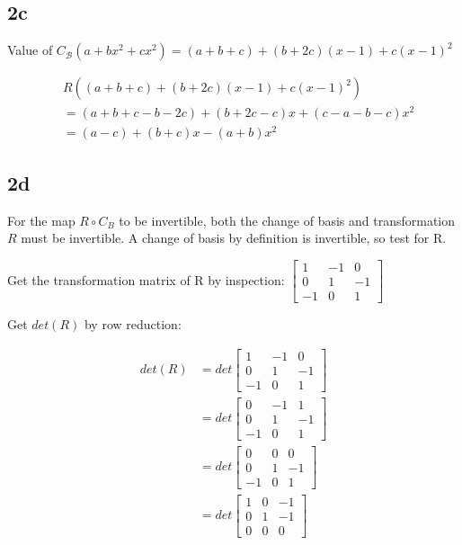 \documentclass{article}
\begin{document}
\subsection*{2c}
Value of $C_\mathcal{B}(a+bx^2+cx^2) = (a+b+c) + (b+2c)(x-1)+c(x-1)^2$

\begin{align*}
    &R((a+b+c)+(b+2c)(x-1)+c(x-1)^2)\\
    &= (a+b+c - b-2c) + (b+2c-c)x + (c-a-b-c) x^2\\
    &= (a-c) + (b+c)x - (a + b)x^2
\end{align*}
\newpage

\subsection*{2d}
For the map $R \circ C_B$ to be invertible, both the change of basis and transformation $R$ must be invertible. A change of basis by definition is invertible, so test for R.

Get the transformation matrix of R by inspection: $
\begin{bmatrix}
1 & -1 & 0 \\
0 & 1 & -1\\
-1 & 0 & 1 
\end{bmatrix}$

Get $det(R)$ by row reduction:

\begin{align*}
det(R) &= det\begin{bmatrix}
1 & -1 & 0 \\
0 & 1 & -1\\
-1 & 0 & 1
\end{bmatrix}\\
&= det\begin{bmatrix}
0 & -1 & 1 \\
0 & 1 & -1\\
-1 & 0 & 1
\end{bmatrix}\\
&= det\begin{bmatrix}
0 & 0 & 0 \\
0 & 1 & -1\\
-1 & 0 & 1
\end{bmatrix}\\
&= det\begin{bmatrix}
1 & 0 & -1 \\
0 & 1 & -1\\
0 & 0 & 0
\end{bmatrix}
\end{align*}
\end{document}
